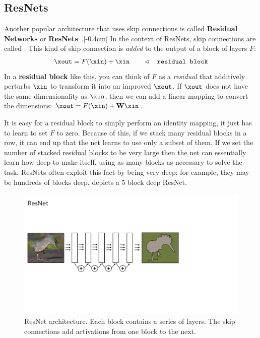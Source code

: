 \subsection{ResNets}
Another popular architecture that uses skip connections is called {\bf Residual Networks} or {\bf ResNets}~\cite{he2016deep}.[-0.4cm]
In the context of ResNets, skip connections are called . This kind of skip connection is \textit{added} to the output of a block of layers $F$:
\begin{align}
    \xout = F(\xin) + \xin \quad\quad \triangleleft \quad \texttt{residual block}
\end{align}
In a {\bf residual block} like this, you can think of $F$ as a \textit{residual} that additively perturbs $\xin$ to transform it into an improved $\xout$. If $\xout$ does not have the same dimensionality as $\xin$, then we can add a linear mapping to convert the dimensions: $\xout = F(\xin) + \mathbf{W}\xin$.

It is easy for a residual block to simply perform an identity mapping, it just has to learn to set $F$ to zero. Because of this, if we stack many residual blocks in a row, it can end up that the net learns to use only a subset of them. If we set the number of stacked residual blocks to be very large then the net can essentially learn how deep to make itself, using as many blocks as necessary to solve the task. ResNets often exploit this fact by being very deep; for example, they may be hundreds of blocks deep. \Fig{\ref{fig:convolutional_neural_nets:resnet}} depicts a 5 block deep ResNet.
\begin{figure}[h]
    \centerline{
        \includegraphics[width=0.85\linewidth]{./figures/convolutional_neural_nets/resnet.pdf}
    }
    \caption{ResNet architecture. Each block contains a series of layers. The skip connections add activations from one block to the next.}
    \label{fig:convolutional_neural_nets:resnet}
\end{figure}


